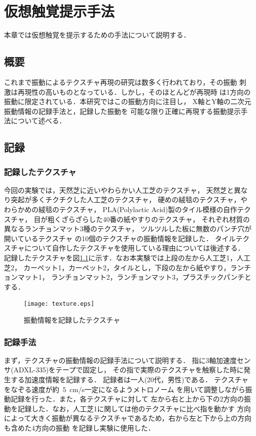 
\chapter{仮想触覚提示手法}

本章では仮想触覚を提示するための手法について説明する．
\section{概要}
これまで振動によるテクスチャ再現の研究は数多く行われており，その振動
刺激は再現性の高いものとなっている．しかし，そのほとんどが再現時
は1方向の振動に限定されている．本研究ではこの振動方向に注目し，
X軸とY軸の二次元振動情報の記録手法と，記録した振動を
可能な限り正確に再現する振動提示手法について述べる．


\section{記録}

\subsection{記録したテクスチャ}
今回の実験では，天然芝に近いやわらかい人工芝のテクスチャ，
天然芝と異なり突起が多くチクチクした人工芝のテクスチャ，
硬めの絨毯のテクスチャ，やわらかめの絨毯のテクスチャ，
PLA(Polylactic Acid)製のタイル模様の自作テクスチャ，
目が粗くざらざらした40番の紙やすりのテクスチャ，
それぞれ材質の異なるランチョンマット3種のテクスチャ，
ツルツルした板に無数のパンチ穴が開いているテクスチャ
の10個のテクスチャの振動情報を記録した．
タイルテクスチャについて自作したテクスチャを使用している理由については後述する．
記録したテクスチャを図\ref{4-4}に示す．なお本実験では上段の左から人工芝1，人工芝2，
カーペット1，カーペット2，タイルとし，下段の左から紙やすり，ランチョンマット1，
ランチョンマット2，ランチョンマット3，プラスチックパンチとする．

\begin{figure}[h]
\begin{center}
  \texttt{[image: texture.eps]}
  \caption{振動情報を記録したテクスチャ}
  \label{4-4}
\end{center}
\end{figure}

\subsection{記録手法}
まず，テクスチャの振動情報の記録手法について説明する．
指に3軸加速度センサ(ADXL-335)をテープで固定し，
その指で実際のテクスチャを触察した時に発生する加速度情報を記録する．
記録者は一人(20代，男性)である．
テクスチャをなぞる速度が約\ 5\ cm/s一定になるようメトロノーム
を用いて調整しながら振動記録を行った．また，各テクスチャに対して
左から右と上から下の2方向の振動を記録した．なお，人工芝1に関しては他のテクスチャに比べ指を動かす
方向によって大きく振動が異なるテクスチャであるため，右から左と下から上の方向も含めた4方向の振動
を記録し実験に使用した．


